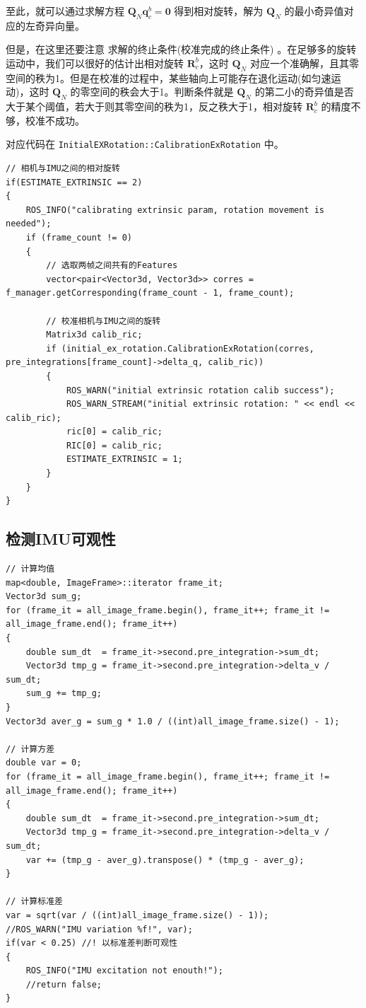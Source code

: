 \documentclass[12pt,a4paper]{article}
\begin{document}
至此，就可以通过求解方程 $\mathbf{Q}_N \mathbf{q}_c^b = \boldsymbol{0}$ 得到相对旋转，解为 $\mathbf{Q}_N$ 的最小奇异值对应的左奇异向量。

但是，在这里还要注意 求解的终止条件(校准完成的终止条件) 。在足够多的旋转运动中，我们可以很好的估计出相对旋转 $\mathbf{R}_{c}^{b}$，这时 $\mathbf{Q}_{N}$ 对应一个准确解，且其零空间的秩为1。但是在校准的过程中，某些轴向上可能存在退化运动(如匀速运动)，这时 $\mathbf{Q}_{N}$ 的零空间的秩会大于1。{\color{blue}判断条件就是 $\mathbf{Q}_N$ 的第二小的奇异值是否大于某个阈值，若大于则其零空间的秩为1，反之秩大于1，相对旋转 $\mathbf{R}_{c}^{b}$ 的精度不够，校准不成功。}  

对应代码在 \verb|InitialEXRotation::CalibrationExRotation| 中。

\begin{lstlisting}
// 相机与IMU之间的相对旋转
if(ESTIMATE_EXTRINSIC == 2)
{
    ROS_INFO("calibrating extrinsic param, rotation movement is needed");
    if (frame_count != 0)
    {
        // 选取两帧之间共有的Features
        vector<pair<Vector3d, Vector3d>> corres = f_manager.getCorresponding(frame_count - 1, frame_count);

        // 校准相机与IMU之间的旋转
        Matrix3d calib_ric;
        if (initial_ex_rotation.CalibrationExRotation(corres, pre_integrations[frame_count]->delta_q, calib_ric))
        {
            ROS_WARN("initial extrinsic rotation calib success");
            ROS_WARN_STREAM("initial extrinsic rotation: " << endl << calib_ric);
            ric[0] = calib_ric;
            RIC[0] = calib_ric;
            ESTIMATE_EXTRINSIC = 1;
        }
    }
}
\end{lstlisting}

\subsection{检测IMU可观性}

\begin{lstlisting}
// 计算均值
map<double, ImageFrame>::iterator frame_it;
Vector3d sum_g;
for (frame_it = all_image_frame.begin(), frame_it++; frame_it != all_image_frame.end(); frame_it++)
{
    double sum_dt  = frame_it->second.pre_integration->sum_dt;
    Vector3d tmp_g = frame_it->second.pre_integration->delta_v / sum_dt;
    sum_g += tmp_g;
}
Vector3d aver_g = sum_g * 1.0 / ((int)all_image_frame.size() - 1);

// 计算方差
double var = 0;
for (frame_it = all_image_frame.begin(), frame_it++; frame_it != all_image_frame.end(); frame_it++)
{
    double sum_dt  = frame_it->second.pre_integration->sum_dt;
    Vector3d tmp_g = frame_it->second.pre_integration->delta_v / sum_dt;
    var += (tmp_g - aver_g).transpose() * (tmp_g - aver_g);
}

// 计算标准差
var = sqrt(var / ((int)all_image_frame.size() - 1));
//ROS_WARN("IMU variation %f!", var);
if(var < 0.25) //! 以标准差判断可观性
{
    ROS_INFO("IMU excitation not enouth!");
    //return false;
}
\end{lstlisting}
\end{document}
